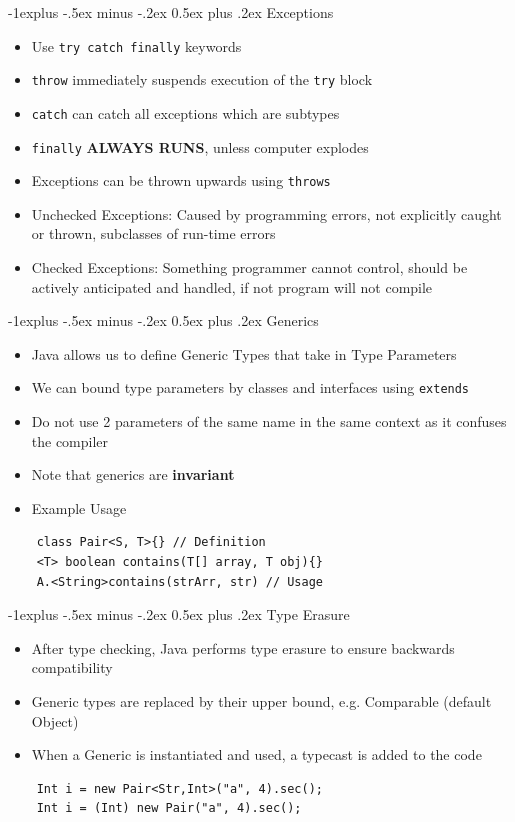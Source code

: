 \documentclass[10pt, landscape]{article}
\makeatletter
\renewcommand{\section}{\@startsection{section}{1}{0mm}%
                                {-1ex plus -.5ex minus -.2ex}%
                                {0.5ex plus .2ex}%
                                {\normalfont\large\bfseries}}
\renewcommand{\section}{\@startsection{section}{2}{0mm}%
                                {-1explus -.5ex minus -.2ex}%
                                {0.5ex plus .2ex}%
                                {\normalfont\normalsize\bfseries}}
\makeatother
\begin{document}
\begin{multicols*}{4}
\section{Exceptions}
\begin{itemize}
    \item Use \lstinline{try catch finally} keywords
    \item \lstinline{throw} immediately suspends execution of the \lstinline{try} block
    \item \lstinline{catch} can catch all exceptions which are subtypes
    \item \lstinline{finally} \textbf{ALWAYS RUNS}, unless computer explodes
    \item Exceptions can be thrown upwards using \lstinline{throws}
    \item Unchecked Exceptions: Caused by programming errors, not explicitly caught or thrown, subclasses of run-time errors
    \item Checked Exceptions: Something programmer cannot control, should be actively anticipated and handled, if not program will not compile
\end{itemize}

\section{Generics}
\begin{itemize}
    \item Java allows us to define Generic Types that take in Type Parameters
    \item We can bound type parameters by classes and interfaces using \lstinline{extends}
    \item Do not use 2 parameters of the same name in the same context as it confuses the compiler
    \item Note that generics are \textbf{invariant}
    \item Example Usage
\end{itemize}
\begin{lstlisting}
    class Pair<S, T>{} // Definition
    <T> boolean contains(T[] array, T obj){}
    A.<String>contains(strArr, str) // Usage
\end{lstlisting}

\section{Type Erasure}
\begin{itemize}
    \item After type checking, Java performs type erasure to ensure backwards compatibility
    \item Generic types are replaced by their upper bound, e.g. Comparable (default Object)
    \item When a Generic is instantiated and used, a typecast is added to the code
\end{itemize}
\begin{lstlisting}
    Int i = new Pair<Str,Int>("a", 4).sec();
    Int i = (Int) new Pair("a", 4).sec();
\end{lstlisting}


\end{multicols*}
\end{document}
